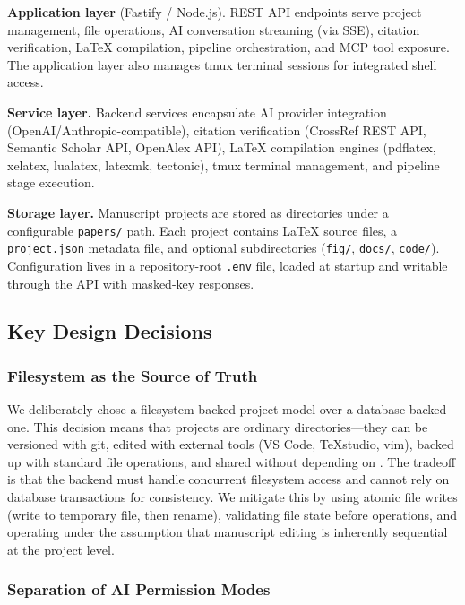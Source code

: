 \textbf{Application layer} (Fastify / Node.js). REST API endpoints serve
project management, file operations, AI conversation streaming (via SSE),
citation verification, \LaTeX{} compilation, pipeline orchestration, and MCP
tool exposure. The application layer also manages tmux terminal sessions for
integrated shell access.

\textbf{Service layer.} Backend services encapsulate AI provider integration
(OpenAI/Anthropic-compatible), citation verification (CrossRef REST API,
Semantic Scholar API, OpenAlex API), \LaTeX{} compilation engines (pdflatex,
xelatex, lualatex, latexmk, tectonic), tmux terminal management, and pipeline
stage execution.

\textbf{Storage layer.} Manuscript projects are stored as directories under a
configurable \texttt{papers/} path. Each project contains \LaTeX{} source
files, a \texttt{project.json} metadata file, and optional subdirectories
(\texttt{fig/}, \texttt{docs/}, \texttt{code/}). Configuration lives in a
repository-root \texttt{.env} file, loaded at startup and writable through the
API with masked-key responses.

\subsection{Key Design Decisions}

\subsubsection{Filesystem as the Source of Truth}

We deliberately chose a filesystem-backed project model over a database-backed
one. This decision means that projects are ordinary directories---they can be
versioned with git, edited with external tools (VS Code, TeXstudio, vim),
backed up with standard file operations, and shared without depending on
\software{}. The tradeoff is that the backend must handle concurrent
filesystem access and cannot rely on database transactions for consistency. We
mitigate this by using atomic file writes (write to temporary file, then
rename), validating file state before operations, and operating under the
assumption that manuscript editing is inherently sequential at the project
level.

\subsubsection{Separation of AI Permission Modes}

